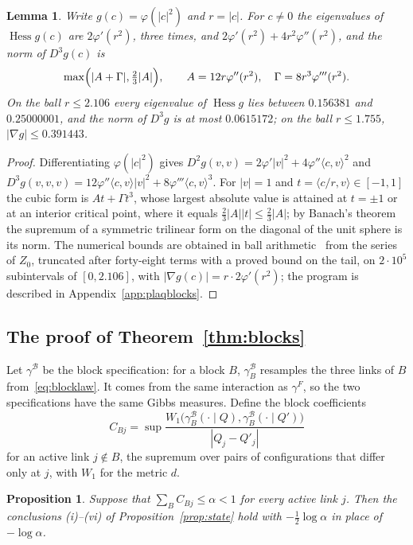 \documentclass[11pt]{amsart}
\newtheorem{lemma}[theorem]{Lemma}
\newtheorem{proposition}[theorem]{Proposition}
\theoremstyle{definition}
\theoremstyle{remark}
\numberwithin{equation}{section}
\newcommand{\Hess}{\operatorname{Hess}}
\newcommand{\ip}[2]{\langle #1,#2\rangle}
\begin{document}
\begin{lemma}\label{lem:vmfconst}
Write $g(c)=\varphi(|c|^2)$ and $r=|c|$. For $c\ne0$ the eigenvalues of
$\Hess g(c)$ are $2\varphi'(r^2)$, three times, and $2\varphi'(r^2)+4r^2
\varphi''(r^2)$, and the norm of $D^3g(c)$ is
\[
\max\Bigl(|A+\Gamma|,\tfrac23|A|\Bigr),\qquad A=12r\varphi''(r^2),\quad
\Gamma=8r^3\varphi'''(r^2).
\]
On the ball $r\le2.106$ every eigenvalue of $\Hess g$ lies between
$0.156381$ and $0.25000001$, and the norm of $D^3g$ is at most $0.0615172$; on
the ball $r\le1.755$, $|\nabla g|\le0.391443$.
\end{lemma}

\begin{proof}
Differentiating $\varphi(|c|^2)$ gives $D^2g(v,v)=2\varphi'|v|^2+4\varphi''
\ip cv^2$ and $D^3g(v,v,v)=12\varphi''\ip cv|v|^2+8\varphi'''\ip cv^3$. For
$|v|=1$ and $t=\ip{c/r}v\in[-1,1]$ the cubic form is $At+\Gamma t^3$, whose
largest absolute value is attained at $t=\pm1$ or at an interior critical
point, where it equals $\frac23|A||t|\le\frac23|A|$; by Banach's
theorem~\cite{Ban38} the supremum of a symmetric trilinear form on the
diagonal of the unit sphere is its norm. The numerical bounds are obtained
in ball arithmetic~\cite{Joh17} from the series of $Z_0$, truncated after
forty-eight terms with a proved bound on the tail, on $2\cdot10^5$ subintervals of
$[0,2.106]$, with $|\nabla g(c)|=r\cdot2\varphi'(r^2)$; the program is described in Appendix~\ref{app:plaqblocks}.
\end{proof}

\subsection{The proof of Theorem~\ref{thm:blocks}}

Let $\gamma^{\mathcal B}$ be the block specification: for a block $B$,
$\gamma^{\mathcal B}_B$ resamples the three links of $B$ from~\eqref{eq:blocklaw}.
It comes from the same interaction as $\gamma^F$, so the two specifications
have the same Gibbs measures. Define the block coefficients
\[
C_{Bj}=\sup\frac{W_1\bigl(\gamma^{\mathcal B}_B(\cdot\mid Q),\gamma^{\mathcal B}_B
(\cdot\mid Q')\bigr)}{|Q_j-Q'_j|}
\]
for an active link $j\notin B$, the supremum over pairs of configurations
that differ only at $j$, with $W_1$ for the metric $d$.

\begin{proposition}\label{prop:blockstate}
Suppose that $\sum_BC_{Bj}\le\alpha<1$ for every active link $j$. Then the
conclusions (i)--(vi) of Proposition~\ref{prop:state} hold with
$-\frac12\log\alpha$ in place of $-\log\alpha$.
\end{proposition}
\end{document}
